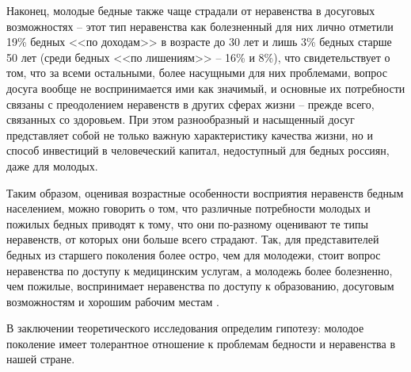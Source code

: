 Наконец, молодые бедные также чаще страдали от неравенства в досуговых 
возможностях -- этот тип неравенства как болезненный для них лично отметили 
19\% бедных <<по доходам>> в возрасте до 30 лет и лишь 3\% бедных старше 50 лет 
(среди бедных <<по лишениям>> -- 16\% и 8\%), что свидетельствует о том, что за 
всеми остальными, более насущными для них проблемами, вопрос досуга вообще не 
воспринимается ими как значимый, и основные их потребности связаны с 
преодолением неравенств в других сферах жизни -- прежде всего, связанных со 
здоровьем. При этом разнообразный и насыщенный досуг представляет собой не 
только важную характеристику качества жизни, но и способ инвестиций в 
человеческий капитал, недоступный для бедных россиян, даже для молодых.

Таким образом, оценивая возрастные особенности восприятия неравенств бедным 
населением, можно говорить о том, что различные потребности молодых и пожилых 
бедных приводят к тому, что они по-разному оценивают те типы неравенств, от 
которых они больше всего страдают. Так, для представителей бедных из старшего 
поколения более остро, чем для молодежи, стоит вопрос неравенства по доступу 
к медицинским услугам, а молодежь более болезненно, чем пожилые, воспринимает 
неравенства по доступу к образованию, досуговым возможностям и хорошим рабочим 
местам \cite{vestnik}. 

В заключении теоретического исследования определим гипотезу: молодое поколение 
имеет толерантное отношение к проблемам бедности и неравенства в нашей стране.

\newpage